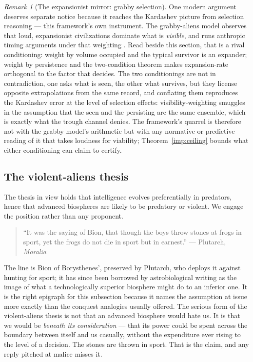\documentclass[11pt]{article}
\theoremstyle{plain}
\theoremstyle{definition}
\theoremstyle{remark}
\newtheorem{remark}[theorem]{Remark}
\begin{document}
\begin{remark}[The expansionist mirror: grabby selection]
\label{gr:rem:grabby}
One modern argument deserves separate notice because it reaches the
Kardashev picture from selection reasoning --- this framework's own
instrument. The grabby-aliens model observes that loud, expansionist
civilizations dominate what is \emph{visible}, and runs anthropic
timing arguments under that weighting \cite{HMMP21}. Read beside this
section, that is a rival conditioning: weight by volume occupied and
the typical survivor is an expander; weight by persistence and the
two-condition theorem makes expansion-rate orthogonal to the factor
that decides. The two conditionings are not in contradiction, one
asks what is seen, the other what survives, but they license
opposite extrapolations from the same record, and conflating them
reproduces the Kardashev error at the level of selection effects:
visibility-weighting smuggles in the assumption that the seen and the
persisting are the same ensemble, which is exactly what the trough
channel denies. The framework's quarrel is therefore not with the
grabby model's arithmetic but with any normative or predictive reading
of it that takes loudness for viability; Theorem~\ref{imp:ceiling} bounds
what either conditioning can claim to certify.
\end{remark}

\subsection{The violent-aliens thesis}\label{gr:subsub:violence}

The thesis in view holds that intelligence evolves preferentially in
predators, hence that advanced biospheres are likely to be predatory or
violent. We engage the position rather than any proponent.

\begin{quote}\small
``It was the saying of Bion, that though the boys throw stones at frogs
in sport, yet the frogs do not die in sport but in earnest.''
\hfill --- Plutarch, \emph{Moralia} \cite{Plutarch}
\end{quote}

\noindent The line is Bion of Borysthenes', preserved by Plutarch, who
deploys it against hunting for sport; it has since been borrowed by
astrobiological writing as the image of what a technologically superior
biosphere might do to an inferior one. It is the right epigraph for this
subsection because it names the assumption at issue more exactly than
the conquest analogies usually offered. The serious form of the
violent-aliens thesis is not that an advanced biosphere would hate us.
It is that we would be \emph{beneath its consideration} --- that its
power could be spent across the boundary between itself and us
casually, without the expenditure ever rising to the level of a
decision. The stones are thrown in sport. That is the claim, and any
reply pitched at malice misses it.
\end{document}
